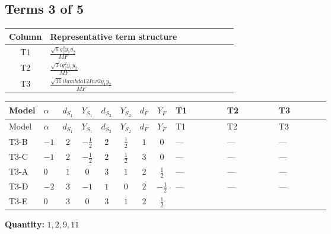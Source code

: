 \documentclass[8pt]{article}
\begin{document}
\begin{landscape}
\subsection*{Terms 3 of 5}
\begin{center}
\begin{tabular}{@{}c >{\raggedright\arraybackslash}p{0.82\linewidth}@{}}
\toprule
Column & Representative term structure \\
\midrule
T1 & \(\displaystyle \frac{\sqrt{6} g_{2}^{2} \overline{y_{1}} \overline{y_{2}}}{MF}\) \\
\midrule
T2 & \(\displaystyle \frac{\sqrt{3} i g_{2}^{2} \overline{y_{1}} \overline{y_{2}}}{MF}\) \\
\midrule
T3 & \(\displaystyle \frac{\sqrt{11} i lambda12Inv2 \overline{y_{1}} \overline{y_{2}}}{MF}\) \\
\midrule
\bottomrule
\end{tabular}
\end{center}
\smallskip
\tiny
\begin{longtable}{@{}llcccccc >{\raggedright\arraybackslash}p{0.21\linewidth} >{\raggedright\arraybackslash}p{0.21\linewidth} >{\raggedright\arraybackslash}p{0.21\linewidth}@{}}
\toprule
Model & $\alpha$ & $d_{S_1}$ & $Y_{S_1}$ & $d_{S_2}$ & $Y_{S_2}$ & $d_F$ & $Y_F$ & T1 & T2 & T3 \\
\midrule
\endfirsthead
\toprule
Model & $\alpha$ & $d_{S_1}$ & $Y_{S_1}$ & $d_{S_2}$ & $Y_{S_2}$ & $d_F$ & $Y_F$ & T1 & T2 & T3 \\
\midrule
\endhead
T3-B & $-1$ & $2$ & $-\frac{1}{2}$ & $2$ & $\frac{1}{2}$ & $1$ & $0$ & --- & --- & --- \\
\midrule
T3-C & $-1$ & $2$ & $-\frac{1}{2}$ & $2$ & $\frac{1}{2}$ & $3$ & $0$ & --- & --- & --- \\
\midrule
T3-A & $0$ & $1$ & $0$ & $3$ & $1$ & $2$ & $\frac{1}{2}$ & --- & --- & --- \\
\midrule
T3-D & $-2$ & $3$ & $-1$ & $1$ & $0$ & $2$ & $-\frac{1}{2}$ & --- & --- & --- \\
\midrule
T3-E & $0$ & $3$ & $0$ & $3$ & $1$ & $2$ & $\frac{1}{2}$ & \scriptsize\adjustbox{max width=\linewidth}{$\begin{gathered} - \frac{\sqrt{6} g_{2}^{2} \overline{y_{1}} \overline{y_{2}}}{6 MF}\end{gathered}$} & \scriptsize\adjustbox{max width=\linewidth}{$\begin{gathered} - \frac{15 \sqrt{3} i g_{2}^{2} \overline{y_{1}} \overline{y_{2}}}{8 MF}\end{gathered}$} & \scriptsize\adjustbox{max width=\linewidth}{$\begin{gathered} - \frac{3 \sqrt{11} i lambda12Inv2 \overline{y_{1}} \overline{y_{2}}}{22 MF}\end{gathered}$} \\
\midrule
\bottomrule
\end{longtable}
\clearpage
\noindent\textbf{Quantity: }$\mathrm{1,2,9,11}$\par\smallskip

\end{landscape}
\end{document}
